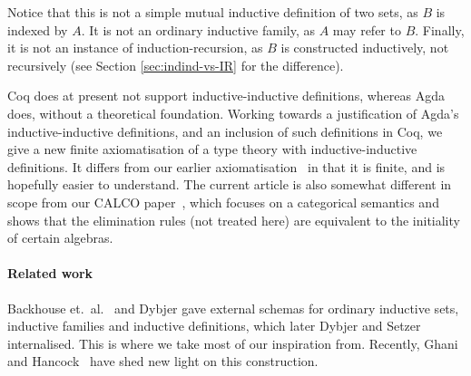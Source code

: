 \documentclass{article}
\begin{document}
Notice that this is not a simple mutual inductive definition of two
sets, as $B$ is indexed by $A$. It is not an ordinary inductive
family, as $A$ may refer to $B$. Finally, it is not an instance of
induction-recursion, as $B$ is constructed inductively, not
recursively (see Section \ref{sec:indind-vs-IR} for the difference).

Coq does at present not support inductive-inductive
definitions, whereas Agda does, without a theoretical foundation.
Working towards a justification of Agda's inductive-inductive
definitions, and an inclusion of such definitions in Coq, we give a
new finite axiomatisation of a type theory with inductive-inductive
definitions. It differs from our earlier
axiomatisation~\cite{nordvallforsbergSetzer2010indind} in that it is
finite, and is hopefully easier to understand.  The current article is
also somewhat different in scope from our CALCO
paper~\cite{nordvallforsbergAltenkirchMorrisSetzer2011catsemindind},
which focuses on a categorical semantics and shows that the
elimination rules (not treated here) are equivalent to the initiality
of certain algebras.






\paragraph{Related work}
\label{sec:related-work}

Backhouse et.\ al.~\cite{backhouse1989diytt,backhouse1988meaning} and
Dybjer \cite{dybjer1994indfam,dybjer2000IR} gave external schemas for
ordinary inductive sets, inductive families and inductive definitions,
which later Dybjer and
Setzer~\cite{dybjersetzer1999finax,dybjersetzer2003inalg,dybjersetzer2006IIR}
internalised. This is where we take most of our inspiration from.
Recently, Ghani and Hancock~\cite{ghaniHancock2012algIR} have shed new
light on this construction.
\end{document}

